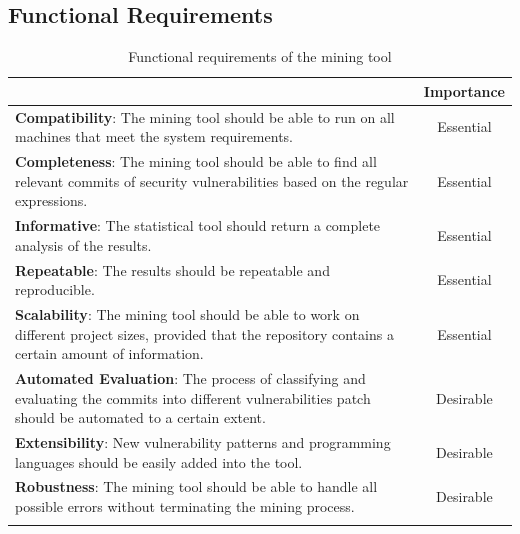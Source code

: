 \documentclass[12pt, a4paper]{report}
\begin{document}
\subsection{Functional Requirements}
\begin{longtable}{|p{10.3cm}|c|}
  \hline \endfirsthead
  \rowcolor[HTML]{D8D8D8}
  \multicolumn{1}{|c|}{Criteria} & Importance \\ \hline
  \textbf{Compatibility}: The mining tool should be able to run on all machines that meet the
  system requirements. & Essential \\ \hline
  \textbf{Completeness}: The mining tool should be able to find all relevant commits of security
  vulnerabilities based on the regular expressions. & Essential \\ \hline
  \textbf{Informative}: The statistical tool should return a complete analysis of the results. &
  Essential \\ \hline
  \textbf{Repeatable}: The results should be repeatable and reproducible. & Essential \\ \hline
  \textbf{Scalability}: The mining tool should be able to work on different project sizes, provided
  that the repository contains a certain amount of information. & Essential \\ \hline
  \textbf{Automated Evaluation}: The process of classifying and evaluating the commits into
  different vulnerabilities patch should be automated to a certain extent. & Desirable \\ \hline
  \textbf{Extensibility}: New vulnerability patterns and programming languages should be easily
  added into the tool. & Desirable \\ \hline
  \textbf{Robustness}: The mining tool should be able to handle all possible errors without
  terminating the mining process. & Desirable \\ \hline
\caption{Functional requirements of the mining tool} \label{table:func_req}
\end{longtable}
\end{document}
